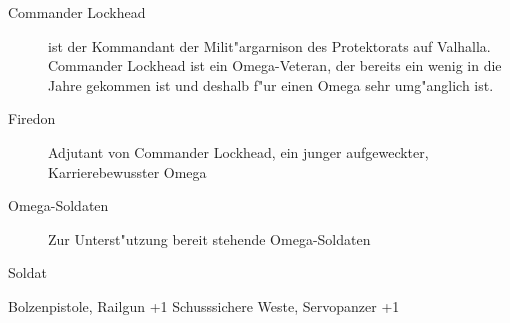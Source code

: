 
\begin{description}
    \item[Commander Lockhead] ist der Kommandant der Milit"argarnison des Protektorats auf Valhalla. Commander Lockhead ist ein 
        Omega-Veteran, der bereits ein wenig in die Jahre gekommen ist und deshalb f"ur einen Omega sehr umg"anglich ist. 
    \item[Firedon] Adjutant von Commander Lockhead, ein junger aufgeweckter, Karrierebewusster Omega
    \item[Omega-Soldaten] Zur Unterst"utzung bereit stehende Omega-Soldaten
\end{description}

\begin{nscsheet}{Soldat}
    \nscstats[ATT=3,AGG=2,CON=2]
    \nscruler
    \begin{nscinventory}
        \nscitem[Waffen] Bolzenpistole, Railgun +1
        \nscitem[R"ustung] Schusssichere Weste, Servopanzer +1
    \end{nscinventory}
\end{nscsheet}
